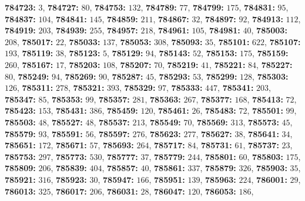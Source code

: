 \textsf{\bfseries 784723:} $3$, \textsf{\bfseries 784727:} $80$, \textsf{\bfseries 784753:} $132$, \textsf{\bfseries 784789:} $77$, \textsf{\bfseries 784799:} $175$, \textsf{\bfseries 784831:} $95$, \textsf{\bfseries 784837:} $104$, \textsf{\bfseries 784841:} $145$, \textsf{\bfseries 784859:} $211$, \textsf{\bfseries 784867:} $32$, \textsf{\bfseries 784897:} $92$, \textsf{\bfseries 784913:} $112$, \textsf{\bfseries 784919:} $203$, \textsf{\bfseries 784939:} $255$, \textsf{\bfseries 784957:} $218$, \textsf{\bfseries 784961:} $105$, \textsf{\bfseries 784981:} $40$, \textsf{\bfseries 785003:} $208$, \textsf{\bfseries 785017:} $22$, \textsf{\bfseries 785033:} $137$, \textsf{\bfseries 785053:} $308$, \textsf{\bfseries 785093:} $35$, \textsf{\bfseries 785101:} $622$, \textsf{\bfseries 785107:} $193$, \textsf{\bfseries 785119:} $38$, \textsf{\bfseries 785123:} $5$, \textsf{\bfseries 785129:} $94$, \textsf{\bfseries 785143:} $52$, \textsf{\bfseries 785153:} $175$, \textsf{\bfseries 785159:} $260$, \textsf{\bfseries 785167:} $17$, \textsf{\bfseries 785203:} $108$, \textsf{\bfseries 785207:} $70$, \textsf{\bfseries 785219:} $41$, \textsf{\bfseries 785221:} $84$, \textsf{\bfseries 785227:} $80$, \textsf{\bfseries 785249:} $94$, \textsf{\bfseries 785269:} $90$, \textsf{\bfseries 785287:} $45$, \textsf{\bfseries 785293:} $53$, \textsf{\bfseries 785299:} $128$, \textsf{\bfseries 785303:} $126$, \textsf{\bfseries 785311:} $278$, \textsf{\bfseries 785321:} $393$, \textsf{\bfseries 785329:} $97$, \textsf{\bfseries 785333:} $447$, \textsf{\bfseries 785341:} $203$, \textsf{\bfseries 785347:} $85$, \textsf{\bfseries 785353:} $99$, \textsf{\bfseries 785357:} $281$, \textsf{\bfseries 785363:} $267$, \textsf{\bfseries 785377:} $168$, \textsf{\bfseries 785413:} $72$, \textsf{\bfseries 785423:} $153$, \textsf{\bfseries 785431:} $386$, \textsf{\bfseries 785459:} $120$, \textsf{\bfseries 785461:} $26$, \textsf{\bfseries 785483:} $72$, \textsf{\bfseries 785501:} $99$, \textsf{\bfseries 785503:} $48$, \textsf{\bfseries 785527:} $48$, \textsf{\bfseries 785537:} $213$, \textsf{\bfseries 785549:} $70$, \textsf{\bfseries 785569:} $313$, \textsf{\bfseries 785573:} $45$, \textsf{\bfseries 785579:} $93$, \textsf{\bfseries 785591:} $56$, \textsf{\bfseries 785597:} $276$, \textsf{\bfseries 785623:} $277$, \textsf{\bfseries 785627:} $38$, \textsf{\bfseries 785641:} $34$, \textsf{\bfseries 785651:} $172$, \textsf{\bfseries 785671:} $57$, \textsf{\bfseries 785693:} $264$, \textsf{\bfseries 785717:} $84$, \textsf{\bfseries 785731:} $61$, \textsf{\bfseries 785737:} $23$, \textsf{\bfseries 785753:} $297$, \textsf{\bfseries 785773:} $530$, \textsf{\bfseries 785777:} $37$, \textsf{\bfseries 785779:} $244$, \textsf{\bfseries 785801:} $60$, \textsf{\bfseries 785803:} $175$, \textsf{\bfseries 785809:} $206$, \textsf{\bfseries 785839:} $404$, \textsf{\bfseries 785857:} $40$, \textsf{\bfseries 785861:} $337$, \textsf{\bfseries 785879:} $326$, \textsf{\bfseries 785903:} $35$, \textsf{\bfseries 785921:} $316$, \textsf{\bfseries 785923:} $30$, \textsf{\bfseries 785947:} $166$, \textsf{\bfseries 785951:} $139$, \textsf{\bfseries 785963:} $224$, \textsf{\bfseries 786001:} $29$, \textsf{\bfseries 786013:} $325$, \textsf{\bfseries 786017:} $206$, \textsf{\bfseries 786031:} $28$, \textsf{\bfseries 786047:} $120$, \textsf{\bfseries 786053:} $186$, 
